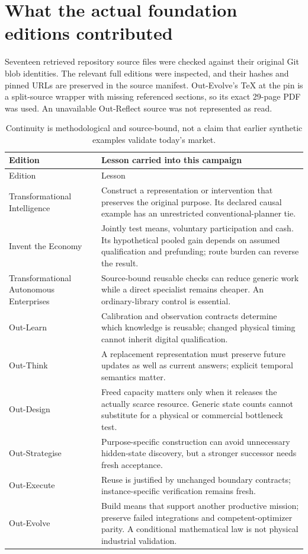 \section{What the actual foundation editions contributed}
Seventeen retrieved repository source files were checked against their original Git blob identities. The relevant full editions were inspected, and their hashes and pinned URLs are preserved in the source manifest. Out-Evolve's TeX at the pin is a split-source wrapper with missing referenced sections, so its exact 29-page PDF was used. An unavailable Out-Reflect source was not represented as read.

\begin{longtable}{L{0.27\textwidth}L{0.64\textwidth}}
\caption{Continuity is methodological and source-bound, not a claim that earlier synthetic examples validate today's market.}\\
\toprule Edition & Lesson carried into this campaign\\
\midrule\endfirsthead
\toprule Edition & Lesson\\\midrule\endhead
Transformational Intelligence & Construct a representation or intervention that preserves the original purpose. Its declared causal example has an unrestricted conventional-planner tie.\\
Invent the Economy & Jointly test means, voluntary participation and cash. Its hypothetical pooled gain depends on assumed qualification and prefunding; route burden can reverse the result.\\
Transformational Autonomous Enterprises & Source-bound reusable checks can reduce generic work while a direct specialist remains cheaper. An ordinary-library control is essential.\\
Out-Learn & Calibration and observation contracts determine which knowledge is reusable; changed physical timing cannot inherit digital qualification.\\
Out-Think & A replacement representation must preserve future updates as well as current answers; explicit temporal semantics matter.\\
Out-Design & Freed capacity matters only when it releases the actually scarce resource. Generic state counts cannot substitute for a physical or commercial bottleneck test.\\
Out-Strategise & Purpose-specific construction can avoid unnecessary hidden-state discovery, but a stronger successor needs fresh acceptance.\\
Out-Execute & Reuse is justified by unchanged boundary contracts; instance-specific verification remains fresh.\\
Out-Evolve & Build means that support another productive mission; preserve failed integrations and competent-optimizer parity. A conditional mathematical law is not physical industrial validation.\\
\bottomrule
\end{longtable}

